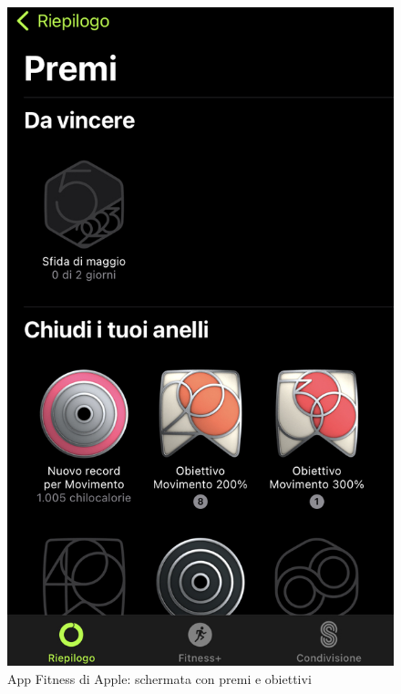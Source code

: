 \begin{figure}
    \begin{minipage}[h]{0.4\textwidth}
        \centering
        \includegraphics[width=1\textwidth]{img/apple-fitness-badge.jpeg}
        \caption{App Fitness di Apple: schermata con premi e obiettivi \cite{appleFitness}}
        \label{fig:appleFitnessBadges}
    \end{minipage}
    \hfill
    \vspace{0.2 cm}
    \begin{minipage}[h]{0.4\linewidth}
        \centering

\end{minipage}
\end{figure}
